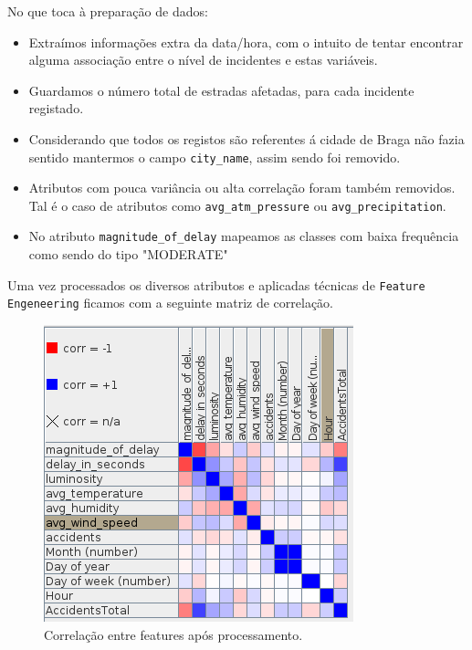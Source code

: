 No que toca à preparação de dados:
\begin{itemize}
    \item Extraímos informações extra da data/hora, com o intuito de tentar encontrar alguma associação entre o nível de incidentes e estas variáveis.
    \item Guardamos o número total de estradas afetadas, para cada incidente registado.
    \item Considerando que todos os registos são referentes á cidade de Braga não fazia sentido mantermos o campo \texttt{city\_name}, assim sendo foi removido.
    \item Atributos com pouca variância ou alta correlação foram também removidos. Tal é o caso de atributos como \texttt{avg\_atm\_pressure} ou \texttt{avg\_precipitation}.
    \item No atributo \texttt{magnitude\_of\_delay} mapeamos as classes com baixa frequência como sendo do tipo "MODERATE"
\end{itemize}

Uma vez processados os diversos atributos e aplicadas técnicas de \texttt{Feature Engeneering} ficamos com a seguinte matriz de correlação.

\begin{figure}[H]
    \centering
    \includegraphics[width=0.5\linewidth]{Figures/correlationBraga.png}
    \caption{Correlação entre features após processamento.}
    \label{fig:corr1}
\end{figure}



